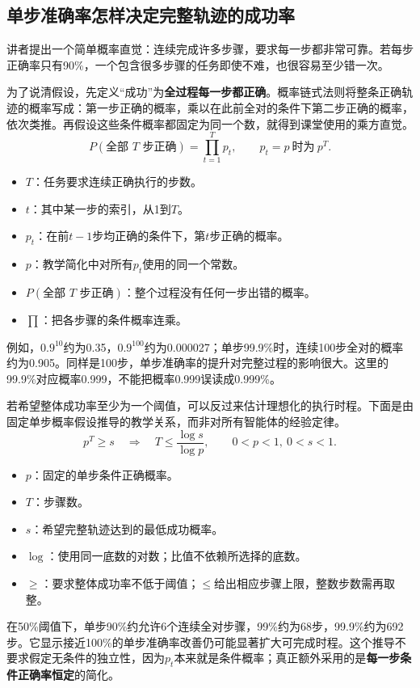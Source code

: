 \documentclass[11pt,a4paper]{article}
\begin{document}
\subsection{单步准确率怎样决定完整轨迹的成功率}
讲者提出一个简单概率直觉：连续完成许多步骤，要求每一步都非常可靠。若每步正确率只有90\%，一个包含很多步骤的任务即使不难，也很容易至少错一次。

为了说清假设，先定义“成功”为\textbf{全过程每一步都正确}。概率链式法则将整条正确轨迹的概率写成：第一步正确的概率，乘以在此前全对的条件下第二步正确的概率，依次类推。再假设这些条件概率都固定为同一个数，就得到课堂使用的乘方直觉。
$$
P(\text{全部 }T\text{ 步正确})=\prod_{t=1}^{T}p_t,
\qquad p_t=p\ \text{时为}\ p^{T}.
$$
\begin{itemize}
\item $T$：任务要求连续正确执行的步数。
\item $t$：其中某一步的索引，从1到$T$。
\item $p_t$：在前$t-1$步均正确的条件下，第$t$步正确的概率。
\item $p$：教学简化中对所有$p_t$使用的同一个常数。
\item $P(\text{全部 }T\text{ 步正确})$：整个过程没有任何一步出错的概率。
\item $\prod$：把各步骤的条件概率连乘。
\end{itemize}

例如，$0.9^{10}$约为0.35，$0.9^{100}$约为0.000027；单步99.9\%时，连续100步全对的概率约为0.905。同样是100步，单步准确率的提升对完整过程的影响很大。这里的99.9\%对应概率0.999，不能把概率0.999误读成0.999\%。

若希望整体成功率至少为一个阈值，可以反过来估计理想化的执行时程。下面是由固定单步概率假设推导的教学关系，而非对所有智能体的经验定律。
$$
p^{T}\geq s
\quad\Longrightarrow\quad
T\leq\frac{\log s}{\log p},\qquad 0<p<1,\ 0<s<1.
$$
\begin{itemize}
\item $p$：固定的单步条件正确概率。
\item $T$：步骤数。
\item $s$：希望完整轨迹达到的最低成功概率。
\item $\log$：使用同一底数的对数；比值不依赖所选择的底数。
\item $\geq$：要求整体成功率不低于阈值；$\leq$给出相应步骤上限，整数步数需再取整。
\end{itemize}

在50\%阈值下，单步90\%约允许6个连续全对步骤，99\%约为68步，99.9\%约为692步。它显示接近100\%的单步准确率改善仍可能显著扩大可完成时程。这个推导不要求假定无条件的独立性，因为$p_t$本来就是条件概率；真正额外采用的是\textbf{每一步条件正确率恒定}的简化。
\end{document}
